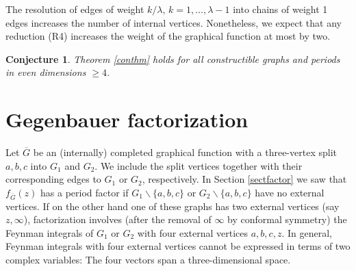 \documentclass[oneside]{amsart}
\newcommand{\Gg}{{\overline{G}}}
\theoremstyle{plain}
\newtheorem{con}[thm]{Conjecture}
\begin{document}
The resolution of edges of weight $k/\lambda$, $k=1,\ldots,\lambda-1$ into chains of weight 1 edges increases the number of internal vertices. Nonetheless, we expect that any reduction (R4)
increases the weight of the graphical function at most by two.
\begin{con}\label{concon}
Theorem \ref{conthm} holds for all constructible graphs and periods in even dimensions $\geq4$.
\end{con}

\section{Gegenbauer factorization}\label{sectgeg}
Let $\Gg$ be an (internally) completed graphical function with a three-vertex split $a,b,c$ into $G_1$ and $G_2$. We include the split vertices together with their corresponding edges
to $G_1$ or $G_2$, respectively.
In Section \ref{sectfactor} we saw that $f_\Gg(z)$ has a period factor if $G_1\backslash\{a,b,c\}$ or $G_2\backslash\{a,b,c\}$ have no external vertices.
If on the other hand one of these graphs has two external vertices (say $z,\infty$), factorization involves (after the removal of $\infty$ by conformal symmetry)
the Feynman integrals of $G_1$ or $G_2$ with four external vertices $a,b,c,z$. In general, Feynman integrals with four external vertices cannot be expressed in terms of two complex variables:
The four vectors span a three-dimensional space.
\end{document}
